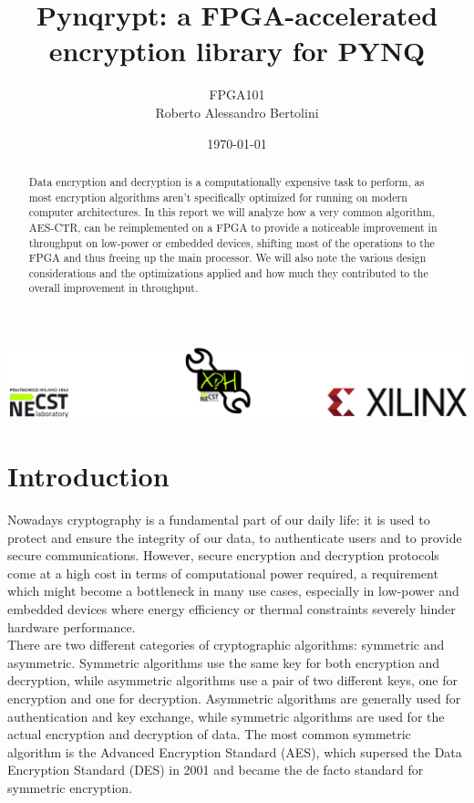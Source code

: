 \documentclass[12pt,oneside,a4paper]{article}
\title{\textbf{Pynqrypt: a FPGA-accelerated encryption library for PYNQ}}
\author{FPGA101\\Roberto Alessandro Bertolini}
\date{\today}
\begin{document}
\begin{titlepage}
	\centering
	\clearpage
	\maketitle
	\thispagestyle{empty}
	\vspace*{1cm}
	\vfill
	\centering
	\includegraphics{footer.png}
\end{titlepage}


\begin{abstract}
Data encryption and decryption is a computationally expensive task to perform, as most encryption algorithms aren't specifically optimized for running on modern computer architectures.
In this report we will analyze how a very common algorithm, AES-CTR, can be reimplemented on a FPGA to provide a noticeable improvement in throughput on low-power or embedded devices, shifting most of the operations to the FPGA and thus freeing up the main processor.
We will also note the various design considerations and the optimizations applied and how much they contributed to the overall improvement in throughput.
\end{abstract}

\section{Introduction} \label{sec:intro}
Nowadays cryptography is a fundamental part of our daily life: it is used to protect and ensure the integrity of our data, to authenticate users and to provide secure communications.
However, secure encryption and decryption protocols come at a high cost in terms of computational power required, a requirement which might become a bottleneck in many use cases, especially in low-power and embedded devices where energy efficiency or thermal constraints severely hinder hardware performance.
\\There are two different categories of cryptographic algorithms: symmetric and asymmetric.
Symmetric algorithms use the same key for both encryption and decryption, while asymmetric algorithms use a pair of two different keys, one for encryption and one for decryption.
Asymmetric algorithms are generally used for authentication and key exchange, while symmetric algorithms are used for the actual encryption and decryption of data.
The most common symmetric algorithm is the Advanced Encryption Standard (AES), which supersed the Data Encryption Standard (DES) in 2001 and became the de facto standard for symmetric encryption.
\end{document}
